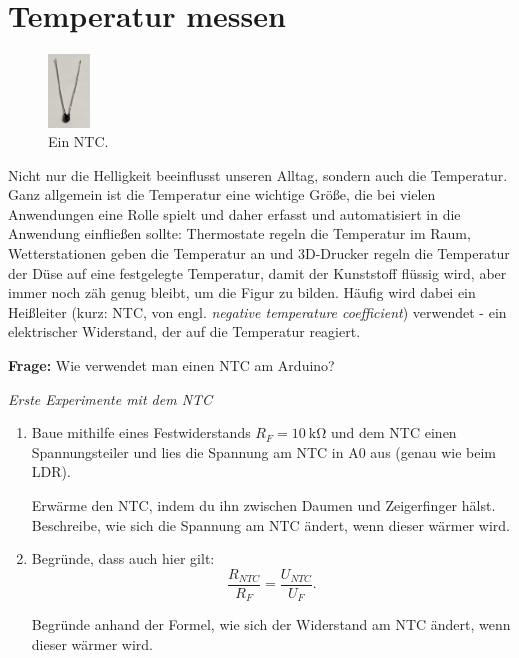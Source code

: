 
\newpage
\section{Temperatur messen}\label{sec:ntc}

\begin{figure}
	\centering
	\includegraphics[width=0.1\textwidth]{./pics/ntc.jpg}
	\caption{Ein NTC.}
\end{figure}
Nicht nur die Helligkeit beeinflusst unseren Alltag, sondern auch die Temperatur. Ganz allgemein ist die Temperatur eine wichtige Größe, die bei vielen Anwendungen eine Rolle spielt und daher erfasst und automatisiert in die Anwendung einfließen sollte: Thermostate regeln die Temperatur im Raum, Wetterstationen geben die Temperatur an und 3D-Drucker regeln die Temperatur der Düse auf eine festgelegte Temperatur, damit der Kunststoff flüssig wird, aber immer noch zäh genug bleibt, um die Figur zu bilden. Häufig wird dabei ein Heißleiter (kurz: NTC, von engl. \emph{negative temperature coefficient}) verwendet - ein elektrischer Widerstand, der auf die Temperatur reagiert.

\begin{ziel}
	\textbf{Frage:} Wie verwendet man einen NTC am Arduino?
\end{ziel}

\begin{aufgabe} \emph{Erste Experimente mit dem NTC}
	\begin{enumerate}[label=\alph*), itemsep=0ex,parsep=0ex]
		\item Baue mithilfe eines Festwiderstands $R_F=\SI{10}{\kilo\ohm}$ und dem NTC einen Spannungsteiler und lies die Spannung am NTC in A0 aus (genau wie beim LDR).
		
		Erwärme den NTC, indem du ihn zwischen Daumen und Zeigerfinger hälst. Beschreibe, wie sich die Spannung am NTC ändert, wenn dieser wärmer wird.
		\item Begründe, dass auch hier gilt:
		\begin{equation*}
			\frac{R_{NTC}}{R_{F}} = \frac{U_{NTC}}{U_{F}}.
		\end{equation*}
		
		Begründe anhand der Formel, wie sich der Widerstand am NTC ändert, wenn dieser wärmer wird.
	\end{enumerate}
\end{aufgabe}

